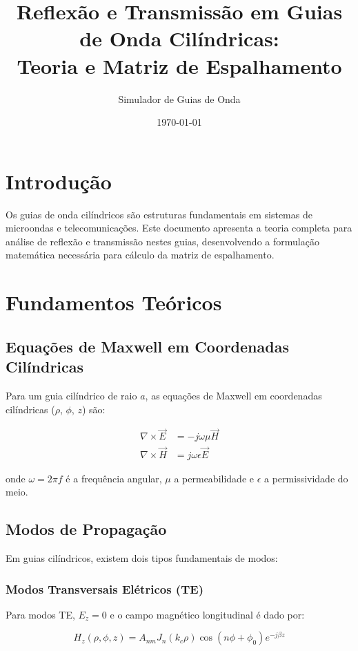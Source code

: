 \documentclass[a4paper,12pt]{article}
\title{Reflexão e Transmissão em Guias de Onda Cilíndricas:\\
Teoria e Matriz de Espalhamento}
\author{Simulador de Guias de Onda}
\date{\today}
\begin{document}
\maketitle

\tableofcontents
\newpage

\section{Introdução}

Os guias de onda cilíndricos são estruturas fundamentais em sistemas de microondas e telecomunicações. Este documento apresenta a teoria completa para análise de reflexão e transmissão nestes guias, desenvolvendo a formulação matemática necessária para cálculo da matriz de espalhamento.

\section{Fundamentos Teóricos}

\subsection{Equações de Maxwell em Coordenadas Cilíndricas}

Para um guia cilíndrico de raio $a$, as equações de Maxwell em coordenadas cilíndricas ($\rho$, $\phi$, $z$) são:

\begin{align}
\nabla \times \vec{E} &= -j\omega\mu \vec{H} \\
\nabla \times \vec{H} &= j\omega\epsilon \vec{E}
\end{align}

onde $\omega = 2\pi f$ é a frequência angular, $\mu$ a permeabilidade e $\epsilon$ a permissividade do meio.

\subsection{Modos de Propagação}

Em guias cilíndricos, existem dois tipos fundamentais de modos:

\subsubsection{Modos Transversais Elétricos (TE)}
Para modos TE, $E_z = 0$ e o campo magnético longitudinal é dado por:

\begin{equation}
H_z(\rho,\phi,z) = A_{nm} J_n(k_c\rho) \cos(n\phi + \phi_0) e^{-j\beta z}
\end{equation}
\end{document}
